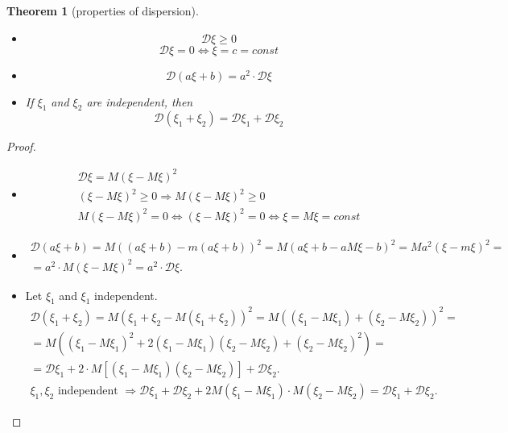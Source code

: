 \documentclass[12pt,letterpaper]{report}
\newtheorem{theorem}{Theorem}
\begin{document}
\begin{theorem}[properties of dispersion]
    \begin{itemize}
        \item[1.] \[ \mathcal{D}\xi \geq 0 \]
            \[ \mathcal{D}\xi = 0 \iff \xi = c = const \]
        \item[2.] \[ \mathcal{D}(a\xi + b) = a^2 \cdot \mathcal{D}\xi \]
        \item[3.] If $\xi_1$ and $\xi_2$ are independent, then 
            \[ \mathcal{D}(\xi_1 + \xi_2) = \mathcal{D}\xi_1 + \mathcal{D}\xi_2 \]
    \end{itemize}
\end{theorem}

\begin{proof}
    \begin{itemize}
        \item[1.]
        \begin{gather*}
                \mathcal{D}\xi = M(\xi - M\xi)^2 \\
                (\xi - M\xi)^2 \geq 0 \Rightarrow M(\xi -M\xi)^2 \geq 0 \\
                M(\xi-M\xi)^2 = 0 \iff (\xi-M\xi)^2 = 0 \iff \xi = M\xi = const
        \end{gather*}
    \item[2.] 
        \begin{gather*}
            \mathcal{D}(a\xi+b) = M((a\xi + b) - m(a\xi+b))^2 = M(a\xi + b - aM\xi -b)^2 = M a^2(\xi-m\xi)^2 = \\
            = a^2 \cdot M(\xi - M\xi)^2 = a^2 \cdot \mathcal{D}\xi.
        \end{gather*}
    \item[3.]
        Let $\xi_1$ and $\xi_1$ independent.
        \begin{gather*}
            \mathcal{D}(\xi_1 + \xi_2) = M(\xi_1 + \xi_2 - M(\xi_1 + \xi_2))^2 = 
            M((\xi_1 - M\xi_1) + (\xi_2 - M\xi_2))^2 = \\
            = M((\xi_1 -M\xi_1)^2 + 2(\xi_1-M\xi_1)(\xi_2-M\xi_2) + (\xi_2-M\xi_2)^2) = \\
            = \mathcal{D}\xi_1 + 2\cdot M[(\xi_1 -M\xi_1)(\xi_2-M\xi_2)] + \mathcal{D}\xi_2. \\
            \text{$\xi_1, \xi_2$ independent } \Rightarrow \mathcal{D}\xi_1 +
            \mathcal{D}\xi_2 + 2M(\xi_1-M\xi_1) \cdot M(\xi_2 -M\xi_2) = \mathcal{D}\xi_1 + \mathcal{D}\xi_2.
        \end{gather*}
    \end{itemize}
\end{proof}
\end{document}
